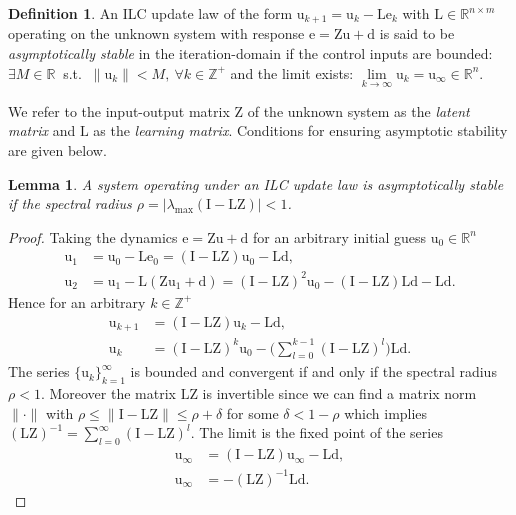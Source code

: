 \documentclass[10pt,a4paper]{article}
\theoremstyle{plain}
\newtheorem{lem}{Lemma}
\theoremstyle{definition}
\newtheorem{defn}{Definition}[section]
\newcommand{\boldvec}[1]{\boldsymbol{\mathrm{#1}}}
\let\vec\boldvec
\newcommand{\error}{\vec{e}} %
\newcommand{\linDist}{\vec{d}} %
\newcommand{\sysInput}{\vec{u}} %
\newcommand{\latentMat}{\vec{Z}} %
\newcommand{\lmatrix}{\vec{L}} %
\begin{document}
\begin{defn} An ILC update law of the form $\sysInput_{k+1} = \sysInput_{k} - \lmatrix \error_{k}$ with $\lmatrix \in \mathbb{R}^{n \times m}$ operating on the unknown system with response $\error = \latentMat \sysInput + \linDist$ is said to be \emph{asymptotically stable} in the iteration-domain if the control inputs are bounded: $\exists M \in \mathbb{R} \ $ s.t. $\ \|\sysInput_k\| < M, \ \forall k \in \mathbb{Z}^{+}$ and the limit exists: $\lim\limits_{k \to \infty}\sysInput_k = \sysInput_{\infty} \in \mathbb{R}^{n}$. \end{defn}
%
We refer to the input-output matrix $\latentMat$ of the unknown system as the \emph{latent matrix} and $\lmatrix$ as the \emph{learning matrix}. Conditions for ensuring asymptotic stability are given below.
%
\begin{lem} A system operating under an ILC update law is asymptotically stable if the spectral radius $\rho = |\lambda_{\mathrm{max}}(\vec{I} - \lmatrix\latentMat)| < 1$. \end{lem}
%
\begin{proof}
Taking the dynamics $\error = \latentMat \sysInput + \linDist$ for an arbitrary initial guess $\sysInput_0 \in \mathbb{R}^{n}$
\begin{align}
\sysInput_1 &= \sysInput_0 - \lmatrix\error_0 = (\vec{I} - \lmatrix\latentMat)\sysInput_0 - \lmatrix\linDist, \\
\sysInput_2 &= \sysInput_1 - \lmatrix(\latentMat\sysInput_1 + \linDist) = (\vec{I} - \lmatrix\latentMat)^{2}\sysInput_0 - (\vec{I} - \lmatrix\latentMat)\lmatrix\linDist - \lmatrix\linDist.
\end{align}
%
\noindent Hence for an arbitrary $k \in \mathbb{Z}^{+}$
%
\begin{align}
\sysInput_{k+1} &= (\vec{I} - \lmatrix\latentMat)\sysInput_{k} - \lmatrix\linDist, \\
\sysInput_k &= (\vec{I} - \lmatrix\latentMat)^{k}\sysInput_0 - \Big(\sum_{l=0}^{k-1}(\vec{I} - \lmatrix\latentMat)^{l}\Big)\lmatrix\linDist.
\end{align}
%
\noindent The series $\{\sysInput_{k}\}_{k=1}^{\infty}$ is bounded and convergent if and only if the spectral radius $\rho < 1$. Moreover the matrix $\lmatrix\latentMat$ is invertible since we can find a matrix norm $\|\cdot\|$ with $\rho \leq \|\vec{I} - \lmatrix\latentMat\| \leq \rho + \delta$ for some $\delta < 1 - \rho$ which implies $(\lmatrix\latentMat)^{-1} = \sum_{l=0}^{\infty}(\vec{I} - \lmatrix\latentMat)^{l}$. The limit is the fixed point of the series
%
\begin{align}
\sysInput_{\infty} &= (\vec{I} - \lmatrix\latentMat)\sysInput_{\infty} - \lmatrix\linDist, \\
\sysInput_{\infty} &= -(\lmatrix\latentMat)^{-1}\lmatrix\linDist.
\end{align}
%
\end{proof}
\end{document}
